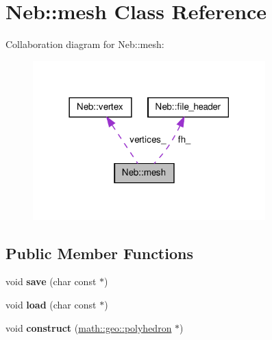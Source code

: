 \hypertarget{classNeb_1_1mesh}{\section{\-Neb\-:\-:mesh \-Class \-Reference}
\label{classNeb_1_1mesh}
}


\-Collaboration diagram for \-Neb\-:\-:mesh\-:\nopagebreak
\begin{figure}[H]
\begin{center}
\leavevmode
\includegraphics[width=254pt]{classNeb_1_1mesh__coll__graph}
\end{center}
\end{figure}
\subsection*{\-Public \-Member \-Functions}
\begin{DoxyCompactItemize}
\item 
\hypertarget{classNeb_1_1mesh_a80555f3c7fe096015bbd3349742372cf}{void {\bfseries save} (char const $\ast$)}\label{classNeb_1_1mesh_a80555f3c7fe096015bbd3349742372cf}

\item 
\hypertarget{classNeb_1_1mesh_a15e84ee2548fc25bf38bf170d9ef1473}{void {\bfseries load} (char const $\ast$)}\label{classNeb_1_1mesh_a15e84ee2548fc25bf38bf170d9ef1473}

\item 
\hypertarget{classNeb_1_1mesh_a38ac06e9bf9628f098a1c59467163abc}{void {\bfseries construct} (\hyperlink{classmath_1_1geo_1_1polyhedron}{math\-::geo\-::polyhedron} $\ast$)}\label{classNeb_1_1mesh_a38ac06e9bf9628f098a1c59467163abc}

\end{DoxyCompactItemize}

